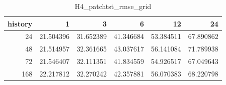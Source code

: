 \begin{table}
\caption{H4_patchtst_rmse_grid}
\label{tab:H4_patchtst_rmse_grid}
\begin{tabular}{rrrrrr}
\toprule
history & 1 & 3 & 6 & 12 & 24 \\
\midrule
24 & 21.504396 & 31.652389 & 41.346684 & 53.384511 & 67.890862 \\
48 & 21.514957 & 32.361665 & 43.037617 & 56.141084 & 71.789938 \\
72 & 21.546407 & 32.111351 & 41.834559 & 54.926517 & 67.049643 \\
168 & 22.217812 & 32.270242 & 42.357881 & 56.070383 & 68.220798 \\
\bottomrule
\end{tabular}
\end{table}
